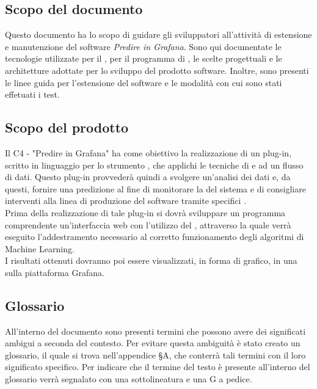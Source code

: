 \documentclass[../manuale-sviluppatore.tex]{subfiles}
\begin{document}
\subsection{Scopo del documento}%
\label{subs:scopo_del_documento}
Questo documento ha lo scopo di guidare gli sviluppatori all'attività di estensione e manutenzione del software \emph{Predire in Grafana}. 
Sono qui documentate le tecnologie utilizzate per il , per il programma di , le scelte progettuali e 
le architetture adottate per lo sviluppo del prodotto software. Inoltre, sono presenti le linee guida per l'estensione del software e le modalità con cui sono stati effetuati i test.

\subsection{Scopo del prodotto}%
\label{subs:scopo_del_prodotto}
Il  C4 - "Predire in Grafana" ha come obiettivo la realizzazione di un plug-in, scritto in linguaggio  
per lo strumento  , che applichi le tecniche di   e 
 ad un flusso di dati. Questo plug-in provvederà quindi a svolgere un'analisi dei dati e, da questi, fornire una 
predizione al fine di monitorare la  del sistema e di consigliare interventi alla linea di produzione del software tramite specifici 
. \\
Prima della realizzazione di tale plug-in si dovrà sviluppare un programma comprendente un'interfaccia web con l'utilizzo del  
, attraverso la quale verrà eseguito l'addestramento necessario al corretto funzionamento degli algoritmi di Machine Learning. \\
I risultati ottenuti dovranno poi essere visualizzati, in forma di grafico, in una  sulla piattaforma Grafana.

\subsection{Glossario}
\label{subs:glossario}
All'interno del documento sono presenti termini che possono avere dei significati ambigui a seconda del contesto. Per evitare questa ambiguità è 
stato creato un glossario, il quale si trova nell'appendice \S A, che conterrà tali termini con il loro significato specifico. Per indicare che il termine 
del testo è presente all'interno del glossario verrà segnalato con una sottolineatura e una G a pedice.
\end{document}
